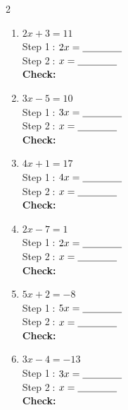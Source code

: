 \documentclass[12pt]{article}
\newcommand{\wsp}{\vspace{2.6cm}}
\newcommand{\sblank}{\underline{\hspace{1.4cm}}}
\begin{document}
\vspace{8pt}
\begin{multicols}{2}
\begin{enumerate}[label=\textbf{\arabic*.}, itemsep=0pt]

  \item $2x + 3 = 11$\\[4pt]
  Step \textcircled{1}: $2x = \sblank$\\[4pt]
  Step \textcircled{2}: $x = \sblank$\\[4pt]
  \textbf{Check:} \underline{\hspace{3.5cm}}
  \wsp

  \item $3x - 5 = 10$\\[4pt]
  Step \textcircled{1}: $3x = \sblank$\\[4pt]
  Step \textcircled{2}: $x = \sblank$\\[4pt]
  \textbf{Check:} \underline{\hspace{3.5cm}}
  \wsp

  \item $4x + 1 = 17$\\[4pt]
  Step \textcircled{1}: $4x = \sblank$\\[4pt]
  Step \textcircled{2}: $x = \sblank$\\[4pt]
  \textbf{Check:} \underline{\hspace{3.5cm}}
  \wsp

  \item $2x - 7 = 1$\\[4pt]
  Step \textcircled{1}: $2x = \sblank$\\[4pt]
  Step \textcircled{2}: $x = \sblank$\\[4pt]
  \textbf{Check:} \underline{\hspace{3.5cm}}
  \wsp

  \item $5x + 2 = -8$\\[4pt]
  Step \textcircled{1}: $5x = \sblank$\\[4pt]
  Step \textcircled{2}: $x = \sblank$\\[4pt]
  \textbf{Check:} \underline{\hspace{3.5cm}}
  \wsp

  \item $3x - 4 = -13$\\[4pt]
  Step \textcircled{1}: $3x = \sblank$\\[4pt]
  Step \textcircled{2}: $x = \sblank$\\[4pt]
  \textbf{Check:} \underline{\hspace{3.5cm}}
  \wsp


\end{enumerate}
\end{multicols}
\end{document}
